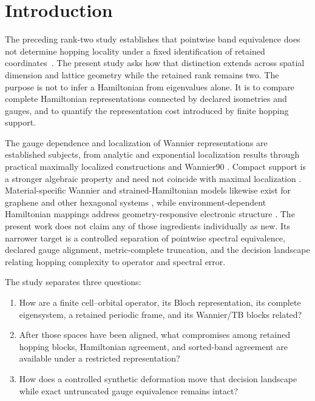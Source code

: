 \documentclass[11pt]{article}
\begin{document}
\section{Introduction}

The preceding rank-two study establishes that pointwise band equivalence does not
determine hopping locality under a fixed identification of retained
coordinates~\cite{Ragasa2026a}. The present study asks how that distinction extends
across spatial dimension and lattice geometry while the retained rank remains two. The
purpose is not to infer a Hamiltonian from eigenvalues alone. It is to compare
complete Hamiltonian representations connected by declared isometries and gauges, and
to quantify the representation cost introduced by finite hopping support.

The gauge dependence and localization of Wannier representations are established
subjects, from analytic and exponential localization results
\cite{Kohn1959AnalyticWannier,Brouder2007ExponentialWannier} through practical
maximally localized constructions and Wannier90
\cite{Mostofi2008Wannier90,Marzari2012MaximallyLocalized}. Compact support is a
stronger algebraic property and need not coincide with maximal localization
\cite{Sathe2024CompactWannier}. Material-specific Wannier and strained-Hamiltonian
models likewise exist for graphene and other hexagonal systems
\cite{Jung2013GrapheneWannier,Fang2018Strained2D}, while environment-dependent
Hamiltonian mappings address geometry-responsive electronic structure
\cite{Zhang2022EquivariantHamiltonians}. The present work does not claim any of those
ingredients individually as new. Its narrower target is a controlled separation of
pointwise spectral equivalence, declared gauge alignment, metric-complete truncation,
and the decision landscape relating hopping complexity to operator and spectral error.

The study separates three questions:
\begin{enumerate}
 \item How are a finite cell--orbital operator, its Bloch representation, its complete
       eigensystem, a retained periodic frame, and its Wannier/TB blocks related?
 \item After those spaces have been aligned, what compromises among retained hopping
       blocks, Hamiltonian agreement, and sorted-band agreement are available under a
       restricted representation?
 \item How does a controlled synthetic deformation move that decision landscape while
       exact untruncated gauge equivalence remains intact?
\end{enumerate}
\end{document}
